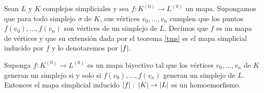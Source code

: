 \begin{Defi}
Sean $L$ y $K$ complejos simpliciales y sea $f\colon K^{(0)} \rightarrow L^{(0)}$ un mapa. Supongamos que  para todo simplejo $\sigma$ de $K$, sus vértices $v_0,...,v_n$ cumplen que los puntos $f(v_0),...,f(v_n)$ son vértices de un simplejo de $L$. Decimos que $f$ es un mapa de vértices y que su extensión dada por el teorema \ref{tms} es el mapa simplicial inducido por $f$ y lo denotaremos por $\left| f \right|$.
\end{Defi}
\begin{Teo}
Suponga $f:K^{(0)}\rightarrow L^{(0)}$ es un mapa biyectivo tal que los vértices $v_0,...,v_n$ de $K$ generan un simplejo si y solo si $f(v_0),...,f(v_n)$ generan un simplejo de $L$. Entonces el mapa simplicial inducido $\left| f \right|\colon \left| K \right|\rightarrow\left| L \right|$ es un homoemorfismo.
\end{Teo}
